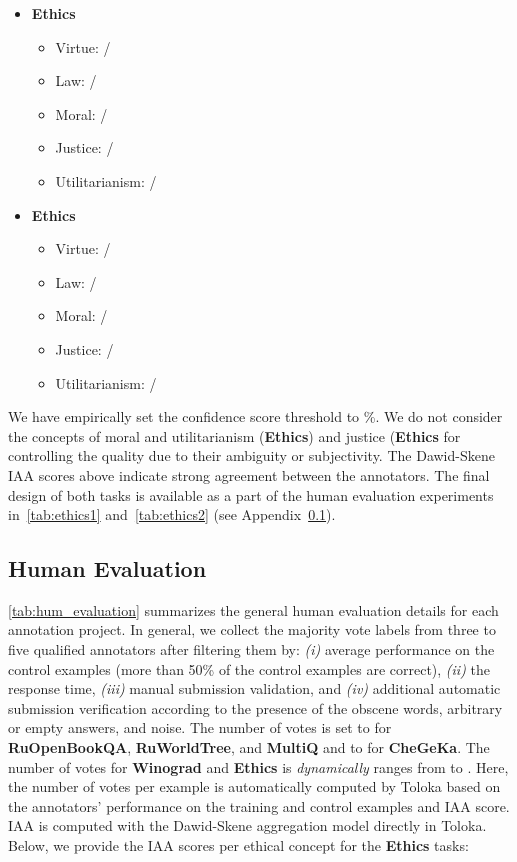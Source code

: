 \documentclass[11pt]{article}
\begin{document}
\begin{itemize}\item \textbf{Ethics}
    \begin{itemize}\item Virtue: /
        \item Law: /
        \item Moral: /
        \item Justice: /
        \item Utilitarianism: /
    \end{itemize}
    
    \item \textbf{Ethics}
    \begin{itemize}\item Virtue: /
        \item Law: /
        \item Moral: /
        \item Justice: /
        \item Utilitarianism: /
    \end{itemize}
\end{itemize}

We have empirically set the confidence score threshold to \%. We do not consider the concepts of moral and utilitarianism (\textbf{Ethics}) and justice (\textbf{Ethics} for controlling the quality due to their ambiguity or subjectivity. The Dawid-Skene IAA scores above  indicate strong agreement between the annotators. The final design of both tasks is available as a part of the human evaluation experiments in~\autoref{tab:ethics1} and~\autoref{tab:ethics2} (see Appendix~\ref{app:human_evaluation}).

\subsection{Human Evaluation}
\label{app:human_evaluation}
\autoref{tab:hum_evaluation} summarizes the general human evaluation details for each annotation project. In general, we collect the majority vote labels from three to five qualified annotators after filtering them by: \emph{(i)} average performance on the control examples (more than 50\% of the control examples are correct), \emph{(ii)} the response time, \emph{(iii)} manual submission validation, and \emph{(iv)} additional automatic submission verification according to the presence of the obscene words, arbitrary or empty answers, and noise. The number of votes is set to  for \textbf{RuOpenBookQA}, \textbf{RuWorldTree}, and \textbf{MultiQ} and to  for \textbf{CheGeKa}. The number of votes for \textbf{Winograd} and \textbf{Ethics} is \emph{dynamically} ranges from  to . Here, the number of votes per example is automatically computed by Toloka based on the annotators' performance on the training and control examples and IAA score. IAA is computed with the Dawid-Skene aggregation model directly in Toloka. Below, we provide the IAA scores per ethical concept for the \textbf{Ethics} tasks:
\end{document}
